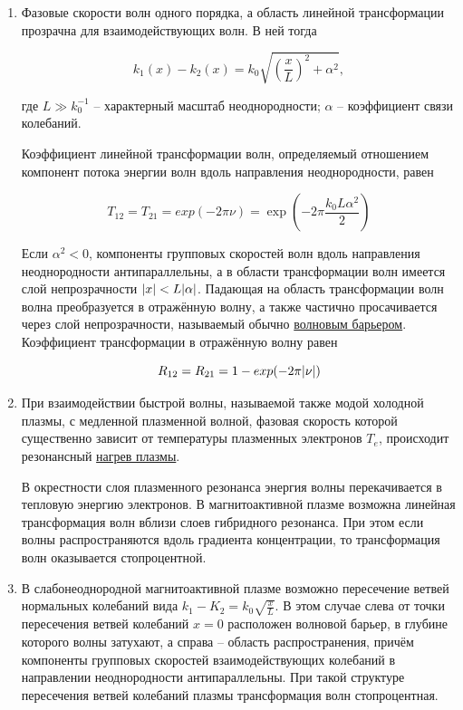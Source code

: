 \documentclass[10pt, a4paper]{article}
\begin{document}
\begin{enumerate}
	
	\item Фазовые скорости волн одного порядка, а область линейной трансформации прозрачна для взаимодействующих волн. В ней тогда
	
	\begin{equation*}
		k_1(x)-k_2(x)=k_0\sqrt{\left(\frac{x}{L}\right)^2+\alpha^2},
	\end{equation*}
	
	где $L\gg k_0^{-1}$ -- характерный масштаб неоднородности; $\alpha$ -- коэффициент связи колебаний.
	
	Коэффициент линейной трансформации волн, определяемый отношением компонент потока энергии волн вдоль направления неоднородности, равен 
	
	\begin{equation*}
		T_{12}=T_{21}=exp(-2\pi\nu)=\exp(-2\pi\frac{k_0L\alpha^2}{2})
	\end{equation*}
	
	Если $\alpha^2<0$, компоненты групповых скоростей волн вдоль направления неоднородности антипараллельны, а в области трансформации волн имеется слой непрозрачности $\abs{x}<L\abs{\alpha}$. Падающая на область трансформации волн волна преобразуется в отражённую волну, а также частично просачивается через слой непрозрачности, называемый обычно \uline{волновым барьером}. Коэффициент трансформации в отражённую волну равен
	
	\begin{equation*}
		R_{12}=R_{21}=1-exp(-2\pi\abs{\nu})
	\end{equation*}	
	
	\item При взаимодействии быстрой волны, называемой также модой холодной плазмы, с медленной плазменной волной, фазовая скорость которой существенно зависит от температуры плазменных электронов $T_e$, происходит резонансный \uline{нагрев плазмы}.
	
	В окрестности слоя плазменного резонанса энергия волны перекачивается в тепловую энергию электронов. В магнитоактивной плазме возможна линейная трансформация волн вблизи слоев гибридного резонанса. При этом если волны распространяются вдоль градиента концентрации, то трансформация волн оказывается стопроцентной.
	
	\item В слабонеоднородной магнитоактивной плазме возможно пересечение ветвей нормальных колебаний вида $k_1-K_2=k_0\sqrt{\frac{x}{L}}$. В этом случае слева от точки пересечения ветвей колебаний $x=0$ расположен волновой барьер, в глубине которого волны затухают, а справа -- область распространения, причём компоненты групповых скоростей взаимодействующих колебаний в направлении неоднородности антипараллельны. При такой структуре пересечения ветвей колебаний плазмы трансформация волн стопроцентная.
	

\end{enumerate}
\end{document}
